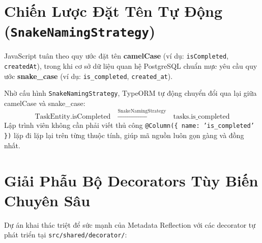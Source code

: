 \documentclass[12pt,a4paper,oneside]{book}
\begin{document}
\section{Chiến Lược Đặt Tên Tự Động (\texttt{SnakeNamingStrategy})}
JavaScript tuân theo quy ước đặt tên \textbf{camelCase} (ví dụ: \texttt{isCompleted}, \texttt{createdAt}), trong khi cơ sở dữ liệu quan hệ PostgreSQL chuẩn mực yêu cầu quy ước \textbf{snake\_case} (ví dụ: \texttt{is\_completed}, \texttt{created\_at}).

Nhờ cấu hình \texttt{SnakeNamingStrategy}, TypeORM tự động chuyển đổi qua lại giữa camelCase và snake\_case:
\begin{equation}
  \text{TaskEntity.isCompleted} \quad \xrightarrow{\text{SnakeNamingStrategy}} \quad \text{tasks.is\_completed}
\end{equation}
Lập trình viên không cần phải viết thủ công \texttt{@Column(\{ name: 'is\_completed' \})} lặp đi lặp lại trên từng thuộc tính, giúp mã nguồn luôn gọn gàng và đồng nhất.

\section{Giải Phẫu Bộ Decorators Tùy Biến Chuyên Sâu}
Dự án khai thác triệt để sức mạnh của Metadata Reflection với các decorator tự phát triển tại \texttt{src/shared/decorator/}:
\end{document}
